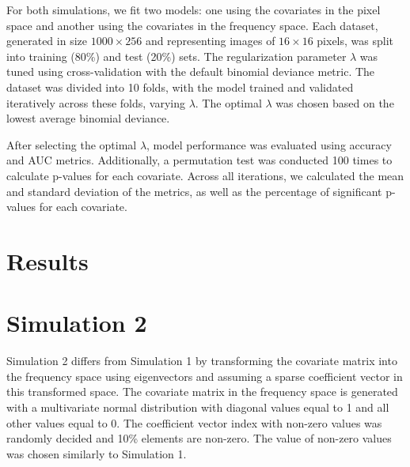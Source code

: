 \documentclass[12pt]{article}
\begin{document}
For both simulations, we fit two models: one using the covariates in the pixel space and another using the covariates in the frequency space. Each dataset, generated in size \( 1000 \times 256 \) and representing images of \( 16 \times 16 \) pixels, was split into training (80\%) and test (20\%) sets. The regularization parameter \( \lambda \) was tuned using cross-validation with the default binomial deviance metric. The dataset was divided into 10 folds, with the model trained and validated iteratively across these folds, varying \( \lambda \). The optimal \( \lambda \) was chosen based on the lowest average binomial deviance.

After selecting the optimal \( \lambda \), model performance was evaluated using accuracy and AUC metrics. Additionally, a permutation test was conducted 100 times to calculate p-values for each covariate. Across all iterations, we calculated the mean and standard deviation of the metrics, as well as the percentage of significant p-values for each covariate.

\section*{Results}

\section*{Simulation 2}

Simulation 2 differs from Simulation 1 by transforming the covariate matrix into the frequency space using eigenvectors and assuming a sparse coefficient vector in this transformed space. The covariate matrix in the frequency space is generated with a multivariate normal distribution with diagonal values equal to 1 and all other values equal to 0. The coefficient vector index with non-zero values was randomly decided and 10\% elements are non-zero. The value of non-zero values was chosen similarly to Simulation 1.
\end{document}
